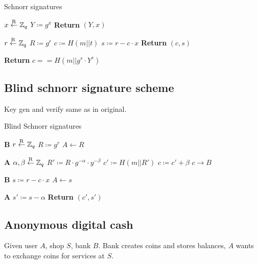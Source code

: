 \begin{algorithm}
		\caption{Schnorr signatures}
		\begin{algorithmic}[0]
				\State $x \overset{\mathrm{R}}{\gets} \mathbb{Z}_q$
				\State $Y \coloneqq g^x$
				\State \textbf{Return} $(Y, x)$
				\EndProcedure

				\State $r \overset{\mathrm{R}}{\gets} \mathbb{Z}_q$
				\State $R \coloneqq g^r$
				\State $c \coloneqq H(m || t)$
				\State $s \coloneqq r - c \cdot x$
				\State \textbf{Return} $(c, s)$
				\EndProcedure

				\State \textbf{Return} $c == H(m || g^s \cdot Y^c)$
				\EndProcedure
		\end{algorithmic}
\end{algorithm}

\subsection{Blind schnorr signature scheme}

Key gen and verify same as in original.

\begin{algorithm}
		\caption{Blind Schnorr signatures}
		\begin{algorithmic}[0]
				\State \textbf{B}
				\State $r \overset{\mathrm{R}}{\gets} \mathbb{Z}_q$
				\State $R \coloneqq g^r$
				\State $A \leftarrow R$

				\State \textbf{A}
				\State $\alpha, \beta \overset{\mathrm{R}}{\gets} \mathbb{Z}_q$
				\State $R' \coloneqq R \cdot g^{-\alpha} \cdot y^{-\beta}$
				\State $c' \coloneqq H(m || R')$
				\State $c \coloneqq c' + \beta$
				\State $c \rightarrow B$

				\State \textbf{B}
				\State $s \coloneqq r - c \cdot x$
				\State $A \leftarrow s$

				\State \textbf{A}
				\State $s' \coloneqq s - \alpha$
				\State \textbf{Return} $(c', s')$
				\EndProcedure
		\end{algorithmic}
\end{algorithm}

\subsection{Anonymous digital cash}

Given user $A$, shop $S$, bank $B$. Bank creates coins and stores balances, $A$
wants to exchange coins for services at $S$.

